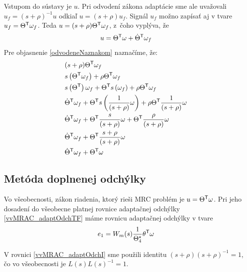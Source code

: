 \documentclass[a4paper, 10pt, ]{article}
\begin{document}
Vstupom do sústavy je $u$. Pri odvodení zákona adaptácie sme ale uvažovali $u_f = (s + \rho)^{-1} u$ odkiaľ $u = (s + \rho)u_f$. Signál $u_f$ možno zapísať aj v tvare $u_f = \Theta^{\mathsf{T}} \omega_f$. Teda $u = (s + \rho) \Theta^{\mathsf{T}} \omega_f$, z~čoho vyplýva, že
\begin{equation} \label{odvodeneNaznakom}
	u = \Theta^{\mathsf{T}} \omega  +  \dot{\Theta}^{\mathsf{T}} \omega_f
\end{equation}
Pre objasnenie \eqref{odvodeneNaznakom} naznačíme, že:
\begin{align*}
	&	(s + \rho) \Theta^{\mathsf{T}} \omega_f \\
	&	s \left( \Theta^{\mathsf{T}} \omega_f \right) + \rho \Theta^{\mathsf{T}} \omega_f \\
	&	s \left( \Theta^{\mathsf{T}} \right) \omega_f + \Theta^{\mathsf{T}} s \left( \omega_f \right) + \rho \Theta^{\mathsf{T}} \omega_f \\
	&	\dot{\Theta}^{\mathsf{T}} \omega_f + \Theta^{\mathsf{T}} s \left( \frac{1}{(s + \rho)} \omega \right) + \rho \Theta^{\mathsf{T}} \frac{1}{(s + \rho)} \omega \\
	&	\dot{\Theta}^{\mathsf{T}} \omega_f + \Theta^{\mathsf{T}} \frac{s}{(s + \rho)} \omega + \Theta^{\mathsf{T}} \frac{\rho}{(s + \rho)} \omega \\
	&	\dot{\Theta}^{\mathsf{T}} \omega_f + \Theta^{\mathsf{T}} \frac{s + \rho}{(s + \rho)} \omega \\
	&	\dot{\Theta}^{\mathsf{T}} \omega_f + \Theta^{\mathsf{T}} \omega
\end{align*}











\subsection{Metóda doplnenej odchýlky}



Vo všeobecnosti, zákon riadenia, ktorý rieši MRC problém je $u = \Theta^{\mathsf{T}} \omega$. Pri jeho dosadení do všeobecne platnej rovnice adaptačnej odchýlky  \eqref{vvMRAC_adaptOdchTF}  máme rovnicu adaptačnej odchýlky v tvare
\begin{equation} \label{vvMRAC_adaptOdchTF_vseob}
	e_1 = W_m(s) \frac{1}{\Theta_4^\star} \theta^{\mathsf{T}} \omega
\end{equation}

V rovnici \eqref{vvMRAC_adaptOdchI} sme použili identitu $(s+\rho)(s+\rho)^{-1} = 1$, čo vo všeobecnosti je $L(s)L(s)^{-1} = 1$.
\end{document}
